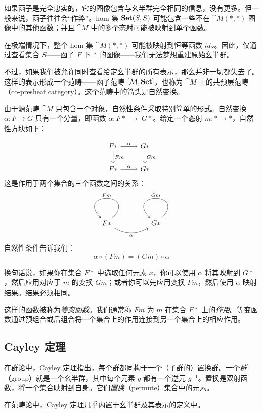 \documentclass[DaoFP]{subfiles}
\begin{document}
如果函子是完全忠实的，它的图像包含与幺半群完全相同的信息，没有更多。但一般来说，函子往往会“作弊”。hom-集 $\mathbf{Set} (S, S)$ 可能包含一些不在 $\cat M(*, *)$ 图像中的其他函数；并且 $\cat M$ 中的多个态射可能被映射到单个函数。

在极端情况下，整个 hom-集 $\cat M(*, *)$ 可能被映射到恒等函数 $id_S$。因此，仅通过查看集合 $S$——函子 $F$ 下 $*$ 的图像——我们无法梦想重建原始幺半群。

不过，如果我们被允许同时查看给定幺半群的所有表示，那么并非一切都失去了。这样的表示形成一个范畴——函子范畴 $[\mathcal{M}, \mathbf{Set}]$，也称为 $\cat M$ 上的共预层范畴（co-presheaf category）。这个范畴中的箭头是自然变换。

由于源范畴 $\cat M$ 只包含一个对象，自然性条件采取特别简单的形式。自然变换 $\alpha \colon F \to G$ 只有一个分量，即函数 $\alpha \colon F *\; \to \;G *$。给定一个态射 $m \colon * \to *$，自然性方块如下：

\[
 \begin{tikzcd}
 F *
 \arrow[r, "\alpha"]
 \arrow[d, "F m"]
 & G *
  \arrow[d, "G m"]
\\
 F *
 \arrow[r, "\alpha"]
 & G *
 \end{tikzcd}
\]
这是作用于两个集合的三个函数之间的关系：
\[
 \begin{tikzcd}
 F *
  \arrow[loop, "F m"']
  \arrow[rr, bend right, "\alpha"']
 && G *
  \arrow[loop, "G m"']
  \end{tikzcd}
\]
自然性条件告诉我们：
\[ \alpha \circ (F m) = (G m) \circ \alpha \]

换句话说，如果你在集合 $F *$ 中选取任何元素 $x$，你可以使用 $\alpha$ 将其映射到 $G *$，然后应用对应于 $m$ 的变换 $G m$；或者你可以先应用变换 $F m$，然后使用 $\alpha$ 映射结果。结果必须相同。

这样的函数被称为\emph{等变函数}。我们通常称 $F m$ 为 $m$ 在集合 $F *$ 上的\emph{作用}。等变函数通过预组合或后组合将一个集合上的作用连接到另一个集合上的相应作用。

\subsection{Cayley 定理}

在群论中，Cayley 定理指出，每个群都同构于一个（子群的）置换群。一个\emph{群}（group）就是一个幺半群，其中每个元素 $g$ 都有一个逆元 $g^{-1}$。置换是双射函数，将一个集合映射到自身。它们\emph{置换}（permute）集合中的元素。

在范畴论中，Cayley 定理几乎内置于幺半群及其表示的定义中。
\end{document}
